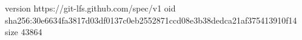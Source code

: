 version https://git-lfs.github.com/spec/v1
oid sha256:30e6634fa3817d03df0137c0eb2552871ccd08e3b38dedca21af375413910f14
size 43864
